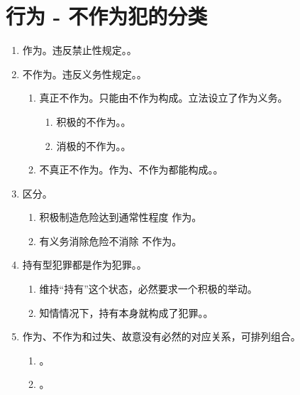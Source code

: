 \section{行为 - 不作为犯的分类}
\begin{enumerate}
  \item 作为。违反禁止性规定。。
  \item 不作为。违反义务性规定。。
        \begin{enumerate}
          \item 真正不作为。只能由不作为构成。立法设立了作为义务。
                \begin{enumerate}
                  \item 积极的不作为。。
                  \item 消极的不作为。。
                \end{enumerate}
          \item 不真正不作为。作为、不作为都能构成。。
        \end{enumerate}
  \item 区分。
        \begin{enumerate}
          \item 积极制造危险达到通常性程度 \yjt 作为。
          \item 有义务消除危险不消除 \yjt 不作为。
        \end{enumerate}
  \item 持有型犯罪都是作为犯罪。。
        \begin{enumerate}
          \item 维持“持有”这个状态，必然要求一个积极的举动。
          \item 知情情况下，持有本身就构成了犯罪。。
        \end{enumerate}
  \item 作为、不作为和过失、故意没有必然的对应关系，可排列组合。
        \begin{enumerate}
          \item {}。
          \item {}。
        \end{enumerate}
\end{enumerate}
